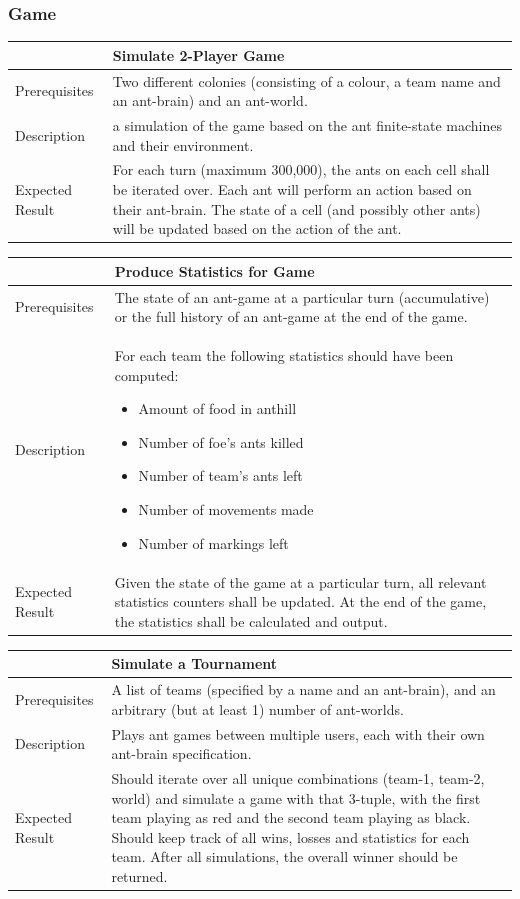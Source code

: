 \documentclass[11pt]{article}
\providecommand{\tightlist}{%
  \setlength{\itemsep}{0pt}\setlength{\parskip}{0pt}}
\begin{document}
\subsubsection{Game}\label{game}

\begin{longtable}[c]{@{}p{}p{}@{}}
\toprule
& Simulate 2-Player Game \tabularnewline
\midrule
Prerequisites & Two different colonies (consisting of a colour, a team
name and an ant-brain) and an ant-world. \tabularnewline
Description & a simulation of the game based on the ant finite-state
machines and their environment. \tabularnewline
Expected Result & For each turn (maximum 300,000), the ants on each cell
shall be iterated over. Each ant will perform an action based on their
ant-brain. The state of a cell (and possibly other ants) will be updated
based on the action of the ant. \tabularnewline
\bottomrule
\end{longtable}

\begin{longtable}[c]{@{}p{}p{}@{}}
\toprule
& Produce Statistics for Game \tabularnewline
\midrule
Prerequisites & The state of an ant-game at a particular turn
(accumulative) or the full history of an ant-game at the end of the
game. \tabularnewline
Description & For each team the following statistics should have been
computed: \begin{itemize}
\tightlist
\item
  Amount of food in anthill
\item
  Number of foe's ants killed
\item
  Number of team's ants left
\item
  Number of movements made
\item
  Number of markings left
\end{itemize} \tabularnewline
Expected Result & Given the state of the game at a particular turn, all
relevant statistics counters shall be updated. At the end of the game,
the statistics shall be calculated and output. \tabularnewline
\bottomrule
\end{longtable}

\begin{longtable}[c]{@{}p{}p{}@{}}
\toprule
& Simulate a Tournament \tabularnewline
\midrule
Prerequisites & A list of teams (specified by a name and an ant-brain),
and an arbitrary (but at least 1) number of ant-worlds. \tabularnewline
Description & Plays ant games between multiple users, each with their
own ant-brain specification. \tabularnewline
Expected Result & Should iterate over all unique combinations (team-1, team-2,
world) and simulate a game with that 3-tuple, with the first team
playing as red and the second team playing as black. Should keep track of all
wins, losses and statistics for each team. After all simulations, the
overall winner should be returned. \tabularnewline
\bottomrule
\end{longtable}
\end{document}
